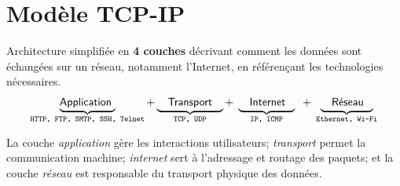 \documentclass[a4paper, 14pt]{report}
\begin{document}
\chapter{Modèle TCP-IP}
    \begin{Définition}[TCP-IP]
        Architecture simplifiée 
        en \textbf{4 couches} décrivant 
        comment les données sont échangées sur un réseau, 
        notamment l'Internet, en référençant les technologies nécessaires. 
        \begin{align*}
            \underbrace{
            \textsf{Application
            }}_{\scriptsize{
                \texttt{HTTP, FTP, SMTP, SSH, Telnet}
            }} 
            + 
            \underbrace{
            \textsf{\phantom{A}
            Transport\phantom{A}
            }}_{\scriptsize{
            \texttt{TCP, UDP}
            }}  
            +\;
            \underbrace{
            \textsf{\phantom{T}
            Internet
            \phantom{p}} }_{
            \scriptsize{\texttt{IP, ICMP}
            }}
            \;\;+ \;
            \underbrace{
            \textsf{\phantom{T}
            Réseau
            \phantom{p}}}_{
            \scriptsize{\texttt{Ethernet, Wi-Fi}
            }}
        \end{align*}

        La couche
        \textit{application} 
            gère les interactions utilisateurs; 
        \textit{transport} 
            permet la communication machine;   
        \textit{internet}   
            sert à l'adressage et routage des paquets;
        et la couche
        \textit{réseau} 
            est responsable du transport physique des données.  
    \end{Définition}
\end{document}
